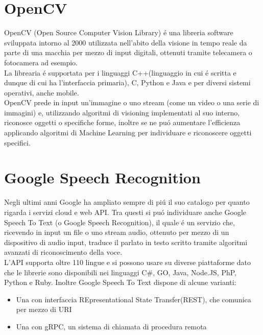 \section{OpenCV}
OpenCV (Open Source Computer Vision Library) \'e una libreria software sviluppata intorno al 2000
utilizzata nell'abito della visione in tempo reale
da parte di una macchia per mezzo di input digitali, ottenuti tramite telecamera o fotocamera ad esempio.\\
La librearia \'e supportata per i linguaggi C++(linguaggio in cui \'e scritta e dunque di cui ha l'interfaccia primaria), C, Python e Java e
per diversi sistemi operativi, anche mobile.\\
OpenCV prede in input un'immagine o uno stream (come un video o una serie di immagini) e, utilizzando algoritmi
di visioning implementati al suo interno, riconosce oggetti o specifiche forme, inoltre se ne pu\'o aumentare l'efficienza
applicando algoritmi di Machine Learning per individuare e riconoscere oggetti specifici.

\section{Google Speech Recognition}
Negli ultimi anni Google ha ampliato sempre di pi\'u il suo catalogo per quanto rigarda
i servizi cloud e web API.
Tra questi si pu\'o individuare anche Google Speech To Text (o Google Speech Recognition), il quale \'e un
servizio che, ricevendo in input un file o uno stream audio, ottenuto per mezzo di un
dispositivo di audio input, traduce il parlato in testo scritto tramite algoritmi avanzati
di riconoscimento della voce.\\
L'API supporta oltre 110 lingue e si possono usare su diverse piattaforme dato che
le librerie sono disponibili nei linguaggi C\#, GO, Java, Node.JS, PhP, Python e Ruby.
Inoltre Google Speech To Text dispone di alcune varianti:
\begin{itemize}
\item Una con interfaccia REpresentational State Transfer(REST), che comunica per mezzo di URI
\item Una con gRPC, un sistema di chiamata di procedura remota
\end{itemize}

